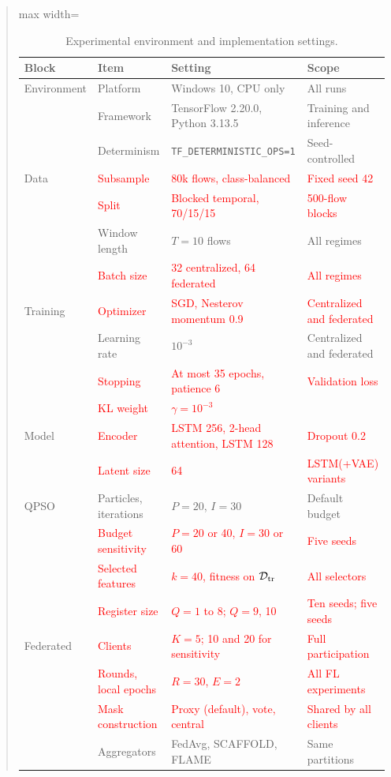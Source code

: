 \documentclass[11pt]{article}
\newenvironment{excerpt}{\begin{quote}\sloppy}{\end{quote}}
\begin{document}
\begin{excerpt}
\setcounter{table}{5}
\begin{table}[H]
\centering
\caption{Experimental environment and implementation settings.}

\def\rc#1{\textcolor{red}{#1}}
\setlength{\tabcolsep}{8pt}
\renewcommand{\arraystretch}{1.3}
\begin{adjustbox}{max width=\linewidth}
\begin{tabular}{l l l l}
\hline\toprule
\textbf{Block} & \textbf{Item} & \textbf{Setting} & \textbf{Scope} \\
\hline\toprule
Environment & Platform & Windows 10, CPU only & All runs \\
 & Framework & TensorFlow 2.20.0, Python 3.13.5 & Training and inference \\
 & Determinism & \texttt{TF\_DETERMINISTIC\_OPS=1} & Seed-controlled \\
\midrule
Data & \rc{Subsample} & \rc{80k flows, class-balanced} & \rc{Fixed seed 42} \\
 & \rc{Split} & \rc{Blocked temporal, 70/15/15} & \rc{500-flow blocks} \\
 & Window length & $T=10$ flows & All regimes \\
 & \rc{Batch size} & \rc{32 centralized, 64 federated} & \rc{All regimes} \\
\midrule
Training & \rc{Optimizer} & \rc{SGD, Nesterov momentum 0.9} & \rc{Centralized and federated} \\
 & Learning rate & $10^{-3}$ & Centralized and federated \\
 & \rc{Stopping} & \rc{At most 35 epochs, patience 6} & \rc{Validation loss} \\
 & \rc{KL weight} & \rc{$\gamma=10^{-3}$} & \\
\midrule
Model & \rc{Encoder} & \rc{LSTM 256, 2-head attention, LSTM 128} & \rc{Dropout 0.2} \\
 & \rc{Latent size} & \rc{64} & \rc{LSTM(+VAE) variants} \\
\midrule
QPSO & Particles, iterations & $P=20$, $I=30$ & Default budget \\
 & \rc{Budget sensitivity} & \rc{$P=20$ or 40, $I=30$ or 60} & \rc{Five seeds} \\
 & \rc{Selected features} & \rc{$k=40$, fitness on $\mathcal{D}_{\rm tr}$} & \rc{All selectors} \\
 & \rc{Register size} & \rc{$Q=1$ to 8; $Q=9$, 10} & \rc{Ten seeds; five seeds} \\
\midrule
Federated & \rc{Clients} & \rc{$K=5$; 10 and 20 for sensitivity} & \rc{Full participation} \\
 & \rc{Rounds, local epochs} & \rc{$R=30$, $E=2$} & \rc{All FL experiments} \\
 & \rc{Mask construction} & \rc{Proxy (default), vote, central} & \rc{Shared by all clients} \\
 & Aggregators & FedAvg, SCAFFOLD, FLAME & Same partitions \\
\hline\toprule
\end{tabular}
\end{adjustbox}
\end{table}


\end{excerpt}
\end{document}
